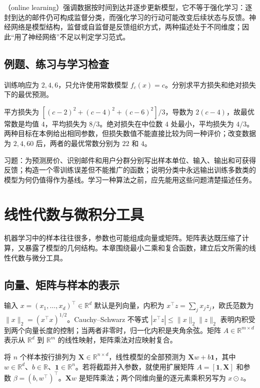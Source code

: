 \documentclass[UTF8,12pt,a4paper,fontset=fandol]{ctexbook}
\begin{document}
（online learning）强调数据按时间到达并逐步更新模型，它不等于强化学习：逐封到达的邮件仍可构成监督分类，而强化学习的行动可能改变后续状态与反馈。神经网络是模型结构，监督或自监督是反馈组织方式，两种描述处于不同维度；因此“用了神经网络”不足以判定学习范式。

\section{例题、练习与学习检查}

\begin{example}[常数预测与学习目标]
训练响应为 $2,4,6$，只允许使用常数模型 $f_c(x)=c$。分别求平方损失和绝对损失下的最优预测。
\end{example}
\begin{solve}
平方损失为 $[(c-2)^2+(c-4)^2+(c-6)^2]/3$，导数为 $2(c-4)$，故最优常数是均值 $4$，平均损失为 $8/3$。绝对损失在中位数 $4$ 处最小，平均损失为 $4/3$。两种目标在本例给出相同参数，但损失数值不能直接比较为同一种评价；改变数据为 $2,4,60$ 后，两者的最优常数分别为 $22$ 和 $4$。
\end{solve}

习题：为预测房价、识别邮件和用户分群分别写出样本单位、输入、输出和可获得反馈；构造一个零训练误差但不能推广的函数；说明分类中永远输出训练多数类的模型为何仍值得作为基线。学习一种算法之前，应先能用这些问题清楚描述任务。

\chapter{线性代数与微积分工具}
\label{chap:ml-linear-algebra}

机器学习中的样本往往很多，参数也可能组成向量或矩阵。矩阵表达既压缩了计算，又暴露了模型的几何结构。本章围绕最小二乘和复合函数，建立后文所需的线性代数与微分工具。

\section{向量、矩阵与样本的表示}

输入 $x=(x_1,\ldots,x_d)^\top\in\mathbb R^d$ 默认是列向量，内积为 $x^\top z=\sum_jx_jz_j$，欧氏范数为 $\|x\|_2=(x^\top x)^{1/2}$。Cauchy--Schwarz 不等式 $|x^\top z|\leq\|x\|_2\|z\|_2$ 表明内积受到两个向量长度的控制；当两者非零时，归一化内积是夹角余弦。矩阵 $A\in\mathbb R^{m\times d}$ 表示从 $\mathbb R^d$ 到 $\mathbb R^m$ 的线性映射，矩阵乘法对应映射复合。

将 $n$ 个样本按行排列为 $\mathbf X\in\mathbb R^{n\times d}$，线性模型的全部预测为 $\mathbf Xw+b\mathbf1$，其中 $w\in\mathbb R^d$、$b\in\mathbb R$、$\mathbf1\in\mathbb R^n$。若将截距并入参数，就使用扩展矩阵 $A=[\mathbf1,\mathbf X]$ 和参数 $\beta=(b,w^\top)^\top$。$\mathbf Xw$ 是矩阵乘法；两个同维向量的逐元素乘积另写为 $x\odot z$。
\end{document}
